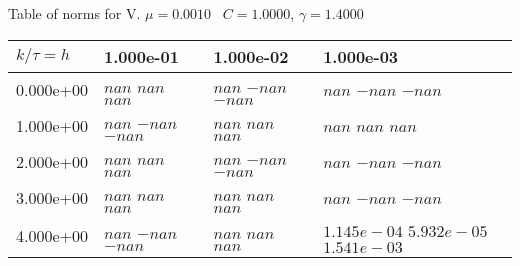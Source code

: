\begin{center}
Table of norms for V. $\mu = 0.0010$ \, $C = 1.0000$, $\gamma = 1.4000$
  
\begin{tabular}{|p{1in}|p{1in}|p{1in}|p{1in}|} \hline
$k / \tau = h$ &1.000e-01 &1.000e-02 &1.000e-03 \\ \hline 
0.000e+00 & $nan$  $nan$  $nan$  & $nan$  $-nan$  $-nan$  & $nan$  $-nan$  $-nan$  \\ \hline 
1.000e+00 & $nan$  $-nan$  $-nan$  & $nan$  $nan$  $nan$  & $nan$  $nan$  $nan$  \\ \hline 
2.000e+00 & $nan$  $nan$  $nan$  & $nan$  $-nan$  $-nan$  & $nan$  $-nan$  $-nan$  \\ \hline 
3.000e+00 & $nan$  $nan$  $nan$  & $nan$  $nan$  $nan$  & $nan$  $-nan$  $-nan$  \\ \hline 
4.000e+00 & $nan$  $-nan$  $-nan$  & $nan$  $nan$  $nan$  & $1.145e-04$  $5.932e-05$  $1.541e-03$  \\ \hline 

\end{tabular}\\[20pt]
\end{center}
